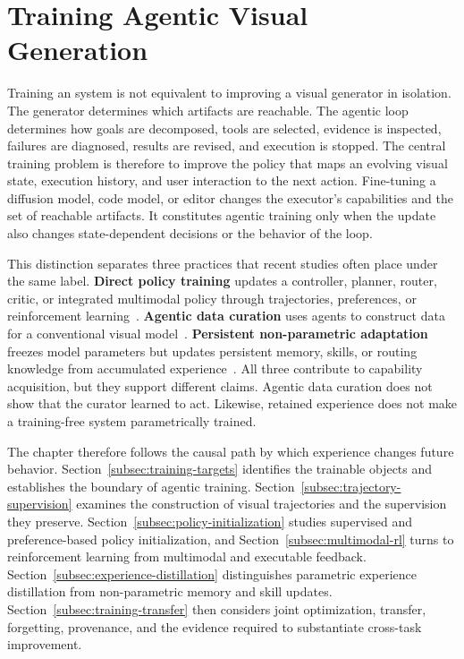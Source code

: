 \section{Training Agentic Visual Generation}
\label{sec:training}

Training an \AVG{} system is not equivalent to improving a visual generator in isolation. The generator determines which artifacts are reachable. The agentic loop determines how goals are decomposed, tools are selected, evidence is inspected, failures are diagnosed, results are revised, and execution is stopped. The central training problem is therefore to improve the policy that maps an evolving visual state, execution history, and user interaction to the next action. Fine-tuning a diffusion model, code model, or editor changes the executor's capabilities and the set of reachable artifacts. It constitutes agentic training only when the update also changes state-dependent decisions or the behavior of the loop.

This distinction separates three practices that recent studies often place under the same label. \textbf{Direct policy training} updates a controller, planner, router, critic, or integrated multimodal policy through trajectories, preferences, or reinforcement learning~\cite{avg260328767,avg260327742,jiang2026genagent,avg260302681,avg260517969,avg260308059,avg260705465}. \textbf{Agentic data curation} uses agents to construct data for a conventional visual model~\cite{avg260320644,avg260603168,avg260631537}. \textbf{Persistent non-parametric adaptation} freezes model parameters but updates persistent memory, skills, or routing knowledge from accumulated experience~\cite{avg260628971,avg260202051,jiang2026octot2i,avg260701709,avg260522208}. All three contribute to capability acquisition, but they support different claims. Agentic data curation does not show that the curator learned to act. Likewise, retained experience does not make a training-free system parametrically trained.

The chapter therefore follows the causal path by which experience changes future behavior. Section~\ref{subsec:training-targets} identifies the trainable objects and establishes the boundary of agentic training. Section~\ref{subsec:trajectory-supervision} examines the construction of visual trajectories and the supervision they preserve. Section~\ref{subsec:policy-initialization} studies supervised and preference-based policy initialization, and Section~\ref{subsec:multimodal-rl} turns to reinforcement learning from multimodal and executable feedback. Section~\ref{subsec:experience-distillation} distinguishes parametric experience distillation from non-parametric memory and skill updates. Section~\ref{subsec:training-transfer} then considers joint optimization, transfer, forgetting, provenance, and the evidence required to substantiate cross-task improvement.

